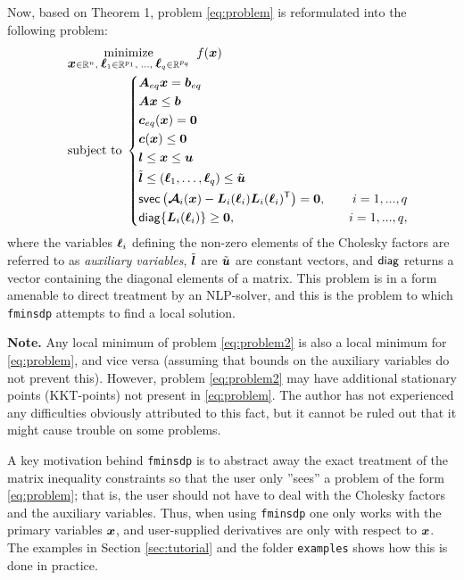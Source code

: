 \documentclass{article}
\newcommand{\bm}[1]{\mbox{\boldmath $#1$}}
\newcommand{\T}{\textsf{T}}
\newcommand{\svec}{\mbox{\textsf{svec}}}
\begin{document}
Now, based on Theorem 1, problem \eqref{eq:problem} is reformulated into the following problem:
\begin{equation}\label{eq:problem2}
\quad
	\begin{aligned}
	&	\underset{\bm{x}\in\mathbb{R}^{n},\; \bm{\ell}_{1}\in\mathbb{R}^{p_{1}},\;\ldots ,\;\bm{\ell}_{q}\in\mathbb{R}^{p_{q}}}{\mbox{minimize}} \;\; f(\bm{x})  \\
	&	\mbox{subject to} \;
	\left\{
		\begin{aligned}
			& \bm{A}_{eq}\bm{x} = \bm{b}_{eq} &\\
			& \bm{A}\bm{x} \leq \bm{b}	      &\\
			& \bm{c}_{eq}(\bm{x}) = \bm{0}	 	&\\
		  & \bm{c}(\bm{x}) \leq \bm{0}			&\\
			& \bm{l} \leq \bm{x} \leq \bm{u}	&\\
			& \tilde{\bm{l}} \leq (\bm{\ell}_{1},\ldots,\bm{\ell}_{q}) \leq \tilde{\bm{u}} & \\
			& \svec\left(\bm{\mathcal{A}}_{i}(\bm{x}) - \bm{L}_{i}(\bm{\ell}_{i})\bm{L}_{i}(\bm{\ell}_{i})^{\T}\right) = \bm{0}, & \quad i = 1,...,q \\
			& \mbox{\textsf{diag}}\{\bm{L}_{i}(\bm{\ell}_{i})\} \geq \bm{0}, & \quad i = 1,...,q,
		\end{aligned}
		\right.
	\end{aligned}
\end{equation}
where the variables $\bm{\ell}_{i}$ defining the non-zero elements of the Cholesky factors are referred to as \textit{auxiliary variables}, $\tilde{\bm{l}}$ are $\tilde{\bm{u}}$ are constant vectors, and $\mbox{\textsf{diag}}$ returns a vector containing the diagonal elements of a matrix. This problem is in a form amenable to direct treatment by an NLP-solver, and this is the problem to which \texttt{fminsdp} attempts to find a local solution.

\vskip 2mm
\noindent \textbf{Note.} Any local minimum of problem \eqref{eq:problem2} is also a local minimum for \eqref{eq:problem}, and vice versa (assuming that bounds on the auxiliary variables do not prevent this). However, problem \eqref{eq:problem2} may have additional stationary points (KKT-points) not present in \eqref{eq:problem}. The author has not experienced any difficulties obviously attributed to this fact, but it cannot be ruled out that it might cause trouble on some problems.
\vskip 2mm

A key motivation behind \texttt{fminsdp} is to abstract away the exact treatment of the matrix inequality constraints so that the user only ''sees'' a problem of the form \eqref{eq:problem}; that is, the user should not have to deal with the Cholesky factors and the auxiliary variables. Thus, when using \texttt{fminsdp} one only works with the primary variables $\bm{x}$, and user-supplied derivatives are only with respect to $\bm{x}$. The examples in Section \ref{sec:tutorial} and the folder \texttt{examples} shows how this is done in practice.
\end{document}

